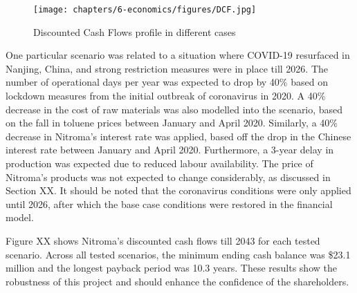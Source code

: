 \begin{wrapfigure}{r}{8cm}
\caption{Discounted Cash Flows profile in different cases}
\label{DCF_scenario}
\texttt{[image: chapters/6-economics/figures/DCF.jpg]}
\end{wrapfigure}

One particular scenario was related to a situation where COVID-19 resurfaced in Nanjing, China, and strong restriction measures were in place till 2026. The number of operational days per year was expected to drop by 40\% based on lockdown measures from the initial outbreak of coronavirus in 2020. A 40\% decrease in the cost of raw materials was also modelled into the scenario, based on the fall in toluene prices between January and April 2020. Similarly, a 40\% decrease in Nitroma’s interest rate was applied, based off the drop in the Chinese interest rate between January and April 2020. Furthermore, a 3-year delay in production was expected due to reduced labour availability. The price of Nitroma’s products was not expected to change considerably, as discussed in Section XX. It should be noted that the coronavirus conditions were only applied until 2026, after which the base case conditions were restored in the financial model.

Figure XX shows Nitroma’s discounted cash flows till 2043 for each tested scenario. Across all tested scenarios, the minimum ending cash balance was \$23.1 million and the longest payback period was 10.3 years. These results show the robustness of this project and should enhance the confidence of the shareholders.
